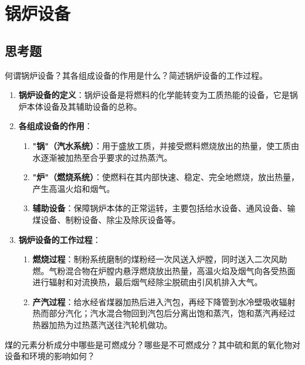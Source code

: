 \chapter{锅炉设备}

\section{思考题}

\begin{problem}
何谓锅炉设备？其各组成设备的作用是什么？简述锅炉设备的工作过程。
\end{problem}

\begin{solution}
\begin{enumerate}
  \item \textbf{锅炉设备的定义}：锅炉设备是将燃料的化学能转变为工质热能的设备，它是锅炉本体设备及其辅助设备的总称。
  \item \textbf{各组成设备的作用}：
  \begin{enumerate}
    \item \textbf{"锅"（汽水系统）}：用于盛放工质，并接受燃料燃烧放出的热量，使工质由水逐渐被加热至合乎要求的过热蒸汽。
    \item \textbf{"炉"（燃烧系统）}：使燃料在其内部快速、稳定、完全地燃烧，放出热量，产生高温火焰和烟气。
    \item \textbf{辅助设备}：保障锅炉本体的正常运转，主要包括给水设备、通风设备、输煤设备、制粉设备、除尘及除灰设备等。
  \end{enumerate}
  \item \textbf{锅炉设备的工作过程}：
  \begin{enumerate}
    \item \textbf{燃烧过程}：制粉系统磨制的煤粉经一次风送入炉膛，同时送入二次风助燃。气粉混合物在炉膛内悬浮燃烧放出热量，高温火焰及烟气向各受热面进行辐射和对流换热，最后烟气经除尘脱硫由引风机排入大气。
    \item \textbf{产汽过程}：给水经省煤器加热后进入汽包，再经下降管到水冷壁吸收辐射热而部分汽化；汽水混合物回到汽包后分离出饱和蒸汽，饱和蒸汽再经过热器加热为过热蒸汽送往汽轮机做功。
  \end{enumerate}
\end{enumerate}
\end{solution}

\begin{problem}
煤的元素分析成分中哪些是可燃成分？哪些是不可燃成分？其中硫和氮的氧化物对设备和环境的影响如何？
\end{problem}

